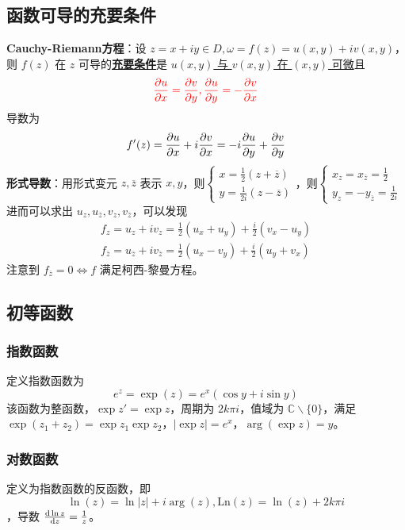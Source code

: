 \documentclass[./main.tex]{subfiles}
\begin{document}
\subsection{函数可导的充要条件}
\textbf{Cauchy-Riemann方程}：设 $z=x+iy\in D,\omega=f(z)=u(x,y)+iv(x,y)$，则 $f(z)$ 在 $z$ 可导的\underline{\textbf{充要条件}}是 \underline{$u(x,y)$ 与 $v(x,y)$ 在 $(x,y)$ 可微}且
\begin{equation}{\color{red}
    \frac{\partial u}{\partial x}=\frac{\partial v}{\partial y},\frac{\partial u}{\partial y}=-\frac{\partial v}{\partial x}    }
\end{equation}
导数为
\begin{equation}
    f'(z)=\frac{\partial u}{\partial x}+i\frac{\partial v}{\partial x}=-i\frac{\partial u}{\partial y}+\frac{\partial v}{\partial y}
\end{equation}
\indent \textbf{形式导数}：用形式变元 $z,\overline{z}$ 表示 $x,y$，则$\begin{cases}x=\frac{1}{2}(z+\overline{z})\\y=\frac{1}{2i}(z-\overline{z})\end{cases}$，则$\begin{cases}x_z=x_{\overline{z}}=\frac{1}{2}\\y_z=-y_{\overline{z}}=\frac{1}{2i}\end{cases}$ 进而可以求出 $u_z,u_{\overline{z}},v_z,v_{\overline{z}}$，可以发现
\begin{gather}
    f_z=u_z+iv_z=\frac{1}{2}(u_x+u_y)+\frac{i}{2}(v_x-u_y)\\
    f_{\overline{z}}=u_{\overline{z}}+iv_{\overline{z}}=\frac{1}{2}(u_x-v_y)+\frac{i}{2}(u_y+v_x)
\end{gather}
注意到 $f_{\overline{z}}=0\iff f$ 满足柯西-黎曼方程。
\subsection{初等函数}
\subsubsection{指数函数}
定义指数函数为 \begin{equation}e^z=\exp(z)=e^x(\cos y+i\sin y)\end{equation}该函数为整函数，$\exp z'=\exp z$，周期为 $2k\pi i$，值域为 $\mathbb{C}\backslash\{0\}$，满足 $\exp(z_1+z_2)=\exp z_1\exp z_2$，$|\exp z|=e^x$，$\arg(\exp z)=y$。
\subsubsection{对数函数}
定义为指数函数的反函数，即
\begin{equation}\ln(z)=\ln|z|+i\arg(z),\text{Ln}(z)=\ln(z)+2k\pi i\end{equation}，导数 $\frac{\text{d}\ln z}{\text{d}z}=\frac{1}{z}$。
\end{document}
